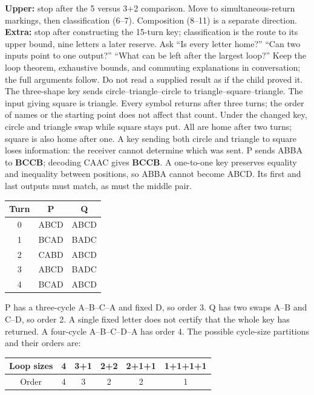 \documentclass[12pt]{extarticle}
\begin{document}
\textbf{Upper:} stop after the 5 versus 3+2 comparison. Move to simultaneous-return markings, then classification (6--7). Composition (8--11) is a separate direction. \textbf{Extra:} stop after constructing the 15-turn key; classification is the route to its upper bound, nine letters a later reserve.
Ask ``Is every letter home?'' ``Can two inputs point to one output?'' ``What can be left after the largest loop?'' Keep the loop theorem, exhaustive bounds, and commuting explanations in conversation; the full arguments follow. Do not read a supplied result as if the child proved it.
\newpage
{}
The three-shape key sends circle--triangle--circle to triangle--square--triangle. The input giving square is triangle. Every symbol returns after three turns; the order of names or the starting point does not affect that count. Under the changed key, circle and triangle swap while square stays put. All are home after two turns; square is also home after one. A key sending both circle and triangle to square loses information: the receiver cannot determine which was sent.
P sends ABBA to \textbf{BCCB}; decoding CAAC gives \textbf{BCCB}. A one-to-one key preserves equality and inequality between positions, so ABBA cannot become ABCD. Its first and last outputs must match, as must the middle pair.
\begin{center}\renewcommand{\arraystretch}{1.4}\begin{tabular}{c|cc}Turn&P&Q\\\hline 0&ABCD&ABCD\\1&BCAD&BADC\\2&CABD&ABCD\\3&ABCD&BADC\\4&BCAD&ABCD\end{tabular}\end{center}
P has a three-cycle A--B--C--A and fixed D, so order 3. Q has two swaps A--B and C--D, so order 2. A single fixed letter does not certify that the whole key has returned.
A four-cycle A--B--C--D--A has order 4. The possible cycle-size partitions and their orders are:
\begin{center}\begin{tabular}{c|ccccc}Loop sizes&4&3+1&2+2&2+1+1&1+1+1+1\\\hline Order&4&3&2&2&1\end{tabular}\end{center}
\end{document}
